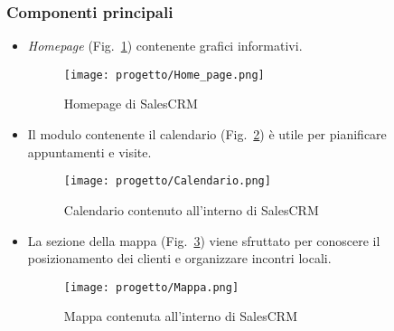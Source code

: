 \subsubsection{Componenti principali}
\begin{itemize}
    \item \emph{Homepage} (Fig.~\ref{fig:salesCRM-home}) contenente grafici informativi.
    
    \begin{figure}[!h] 
        \centering 
        \texttt{[image: progetto/Home\_page.png]} 
        \caption{Homepage di SalesCRM}
        \label{fig:salesCRM-home}
      \end{figure}

    \item Il modulo contenente il calendario (Fig.~\ref{fig:salesCRM-calendario}) è utile per pianificare appuntamenti e visite.
    
    \begin{figure}[!h] 
        \centering 
        \texttt{[image: progetto/Calendario.png]} 
        \caption{Calendario contenuto all'interno di SalesCRM}
        \label{fig:salesCRM-calendario}
      \end{figure}

    \item La sezione della mappa (Fig.~\ref{fig:salesCRM-mappa}) viene sfruttato per conoscere il posizionamento dei clienti e organizzare incontri locali.
    
    \begin{figure}[!h] 
        \centering 
        \texttt{[image: progetto/Mappa.png]} 
        \caption{Mappa contenuta all'interno di SalesCRM}
        \label{fig:salesCRM-mappa}
      \end{figure}
    
\end{itemize}

\newpage

